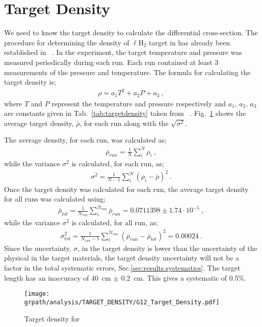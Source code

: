 \section{Target Density}\label{sec:analysis.target_density}

We need to know the target density to calculate the differential cross-section. The procedure for determining the density of $\ell$H$_2$ target in  has already been established in ~\cite{clas.target.density}. In the  experiment, the target temperature and pressure was measured periodically during each run. Each run contained at least 3 measurements of the pressure and temperature. The formula for calculating the target density is;
\begin{align}
\rho = a_1T^2 + a_2P +a_3 \label{eq:target_density} \ ,
\end{align} 
where $T$ and $P$ represent the temperature and pressure respectively and $a_1$, $a_2$, $a_3$ are constants given in Tab.~\ref{tab:targetdensity} taken from ~\cite{mccarty}. Fig.~\ref{fig:target_density} shows the average target density, $\bar \rho$, for each run along with the $\sqrt{\sigma^2}$.

The average density, for each run, was calculated as;
\begin{align}
\bar \rho_{run} = \frac{1}{N}\sum_i^N \rho_i \ ,
\end{align} 
while the variance $\sigma^2$ is calculated, for each run, as;
\begin{align}
\sigma^2 = \frac{1}{N - 1}\sum_i^N (\rho_i - \bar \rho)^2 \ .
\end{align}
Once the target density was calculated for each run, the average target density for all  runs was calculated using;
\begin{align}
\bar \rho_{tot} = \frac{1}{N_{run}}\sum_i^{N_{run}} \bar \rho_{run} = 0.0711398 \pm 1.74 \cdot10^{-5}\ ,
\end{align} 
while the variance $\sigma^2$ is calculated, for all  run, as;
\begin{align}
\sigma_{tot}^2 = \frac{1}{N_{run} -1}\sum_i^{N_{run}} (\bar \rho_{run} - \bar \rho_{tot})^2 = 0.00024 \ .
\end{align}
Since the uncertainty, $\sigma$, in the target density is lower than the uncertainty of the physical in the target materials, the target density uncertainty will not be a factor in the total systematic errors, Sec.\ref{sec:results.systematics}. The target length has an inaccuracy of 40~cm $\pm$ 0.2~cm. This gives a systematic of 0.5\%. 

\begin{figure}[h!]\begin{center}
\texttt{[image: \\grpath/analysis/TARGET\_DENSITY/G12\_Target\_Density.pdf]}
\caption[Target density for ]{\label{fig:target_density}Target density for }
\end{center}\end{figure}
\FloatBarrier